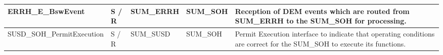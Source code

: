 \begin{longtable}{|l|l|l|l|l|}
\hline\hline
\endhead
\hline
\endfoot
\hline
\endlastfoot
\begin{minipage}{0.39\linewidth}\raggedright\vspace{.75ex}ERRH\_E\_BswEvent\vspace{.75ex}\end{minipage} & \begin{minipage}{0.07\linewidth}\raggedright\vspace{.75ex}S / R\vspace{.75ex}\end{minipage} & \begin{minipage}{0.11\linewidth}\raggedright\vspace{.75ex}SUM\_ERRH\vspace{.75ex}\end{minipage} & \begin{minipage}{0.11\linewidth}\raggedright\vspace{.75ex}SUM\_SOH\vspace{.75ex}\end{minipage} & \begin{minipage}{0.16\linewidth}\raggedright\vspace{.75ex}Reception of DEM events which are routed from SUM\_ERRH to the SUM\_SOH for processing.\vspace{.75ex}\end{minipage}\\\hline
\begin{minipage}{0.39\linewidth}\raggedright\vspace{.75ex}SUSD\_SOH\_PermitExecution\vspace{.75ex}\end{minipage} & \begin{minipage}{0.07\linewidth}\raggedright\vspace{.75ex}S / R\vspace{.75ex}\end{minipage} & \begin{minipage}{0.11\linewidth}\raggedright\vspace{.75ex}SUM\_SUSD\vspace{.75ex}\end{minipage} & \begin{minipage}{0.11\linewidth}\raggedright\vspace{.75ex}SUM\_SOH\vspace{.75ex}\end{minipage} & \begin{minipage}{0.16\linewidth}\raggedright\vspace{.75ex}Permit Execution interface to indicate that operating conditions are correct for the SUM\_SOH to execute its functions.\vspace{.75ex}\end{minipage}\\\hline

\end{longtable}
